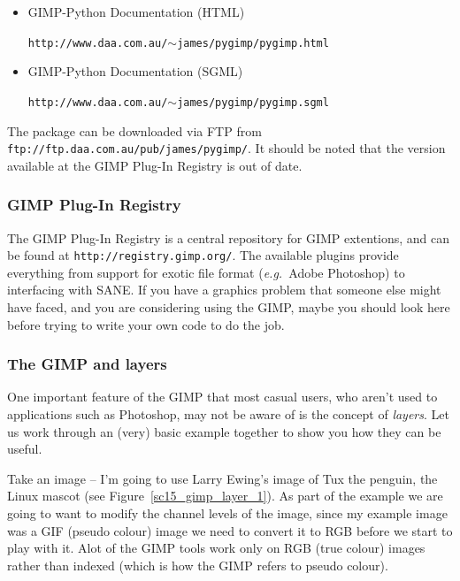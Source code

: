 \documentclass[twoside,11pt]{article}
\newcommand{\htmladdnormallink}[2]{#1}
\newcommand{\htmlref}[2]{#1}
\newcommand{\latex}[1]{#1}
\begin{document}
\begin{itemize}
\item {GIMP-Python Documentation (HTML)}\\
\begin{small}\htmladdnormallink{{\tt http://www.daa.com.au/$\sim$james/pygimp/pygimp.html}}{http://www.daa.com.au/~james/pygimp/pygimp.html}\end{small}
\item {GIMP-Python Documentation (SGML)}\\
\begin{small}\htmladdnormallink{{\tt http://www.daa.com.au/$\sim$james/pygimp/pygimp.sgml}}{http://www.daa.com.au/~james/pygimp/pygimp.sgml}\end{small}
\end{itemize}

The package can be downloaded via FTP from \htmladdnormallink{{\tt ftp://ftp.daa.com.au/pub/james/pygimp/}}{ftp://ftp.daa.com.au/pub/james/pygimp/}. It should be noted that the version available at the GIMP Plug-In Registry is out of date.

\subsubsection{GIMP Plug-In Registry}

The GIMP \htmladdnormallink{Plug-In Registry}{http://registry.gimp.org/} is a central repository for GIMP extentions\latex{, and can be found at {\tt http://registry.gimp.org/}}. The available plugins provide everything from support for exotic file format ({\em e.g.\ }Adobe Photoshop) to interfacing with \htmlref{SANE}{sc15_scanners}. If you have a graphics problem that someone else might have faced, and you are considering using the GIMP, maybe you should look here before trying to write your own code to do the job.

\subsubsection{The GIMP and layers}

One important feature of the GIMP that most casual users, who aren't used to applications such as Photoshop, may not be aware of is the concept of {\em layers}. Let us work through an (very) basic example together to show you how they can be useful.

Take an image -- I'm going to use Larry Ewing's image of \htmladdnormallink{Tux the penguin}{http://www.woodsoup.org/projs/tux_aqfh/doc/index.html}, the Linux mascot (see Figure~\ref{sc15_gimp_layer_1}). As part of the example we are going to want to modify the channel levels of the image, since my example image was a GIF (pseudo colour) image we need to convert it to RGB before we start to play with it. Alot of the GIMP tools work only on RGB (true colour) images rather than indexed (which is how the GIMP refers to \htmlref{pseudo colour}{sc15_pseudo}). 
\end{document}
